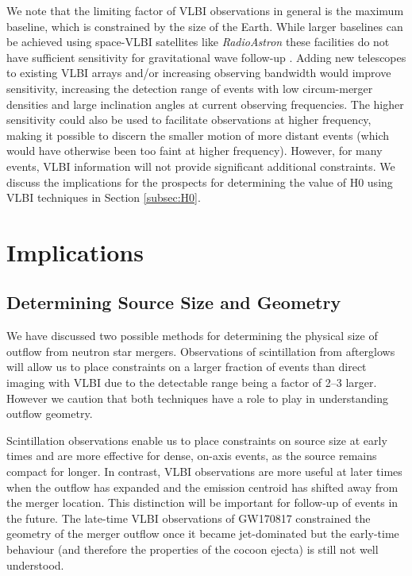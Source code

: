 We note that the limiting factor of VLBI observations in general is the maximum baseline, which is constrained by the size of the Earth. While larger baselines can be achieved using space-VLBI satellites like \emph{RadioAstron} these facilities do not have sufficient sensitivity for gravitational wave follow-up \citep{2013ARep...57..153K}. Adding new telescopes to existing VLBI arrays and/or increasing observing bandwidth would improve sensitivity, increasing the detection range of events with low circum-merger densities and large inclination angles at current observing frequencies. The higher sensitivity could also be used to facilitate observations at higher frequency, making it possible to discern the smaller motion of more distant events (which would have otherwise been too faint at higher frequency). However, for many events, VLBI information will not provide significant additional constraints. We discuss the implications for the prospects for determining the value of H0 using VLBI techniques in Section \ref{subsec:H0}.



\section{Implications}
\subsection{Determining Source Size and Geometry}
We have discussed two possible methods for determining the physical size of outflow from neutron star mergers. Observations of scintillation from afterglows will allow us to place constraints on a larger fraction of events than direct imaging with VLBI due to the detectable range being a factor of 2--3 larger. However we caution that both techniques have a role to play in understanding outflow geometry.

Scintillation observations enable us to place constraints on source size at early times and are more effective for dense, on-axis events, as the source remains compact for longer. In contrast, VLBI observations are more useful at later times when the outflow has expanded and the emission centroid has shifted away from the merger location. This distinction will be important for follow-up of events in the future. The late-time VLBI observations of GW170817 constrained the geometry of the merger outflow once it became jet-dominated \citep[tens of days post-merger;][]{2018Natur.561..355M,2019Sci...363..968G} but the early-time behaviour (and therefore the properties of the cocoon ejecta) is still not well understood.

